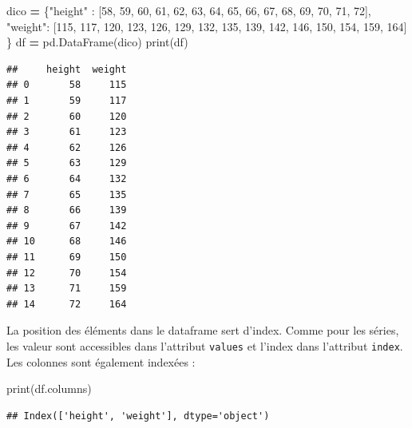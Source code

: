 \documentclass[
  12pt,
]{book}
\newenvironment{Shaded}{\begin{snugshade}}{\end{snugshade}}
\newcommand{\BuiltInTok}[1]{#1}
\newcommand{\DecValTok}[1]{\textcolor[rgb]{0.00,0.00,0.81}{#1}}
\newcommand{\NormalTok}[1]{#1}
\newcommand{\OperatorTok}[1]{\textcolor[rgb]{0.81,0.36,0.00}{\textbf{#1}}}
\newcommand{\StringTok}[1]{\textcolor[rgb]{0.31,0.60,0.02}{#1}}
\numberwithin{equation}{section}
\numberwithin{countremarque}{section}
\begin{document}
\begin{Shaded}
\begin{Highlighting}[]
\NormalTok{dico }\OperatorTok{=}\NormalTok{ \{}\StringTok{"height"}\NormalTok{ : }
\NormalTok{               [}\DecValTok{58}\NormalTok{, }\DecValTok{59}\NormalTok{, }\DecValTok{60}\NormalTok{, }\DecValTok{61}\NormalTok{, }\DecValTok{62}\NormalTok{,}
                \DecValTok{63}\NormalTok{, }\DecValTok{64}\NormalTok{, }\DecValTok{65}\NormalTok{, }\DecValTok{66}\NormalTok{, }\DecValTok{67}\NormalTok{,}
                \DecValTok{68}\NormalTok{, }\DecValTok{69}\NormalTok{, }\DecValTok{70}\NormalTok{, }\DecValTok{71}\NormalTok{, }\DecValTok{72}\NormalTok{],}
        \StringTok{"weight"}\NormalTok{: }
\NormalTok{               [}\DecValTok{115}\NormalTok{, }\DecValTok{117}\NormalTok{, }\DecValTok{120}\NormalTok{, }\DecValTok{123}\NormalTok{, }\DecValTok{126}\NormalTok{,}
                \DecValTok{129}\NormalTok{, }\DecValTok{132}\NormalTok{, }\DecValTok{135}\NormalTok{, }\DecValTok{139}\NormalTok{, }\DecValTok{142}\NormalTok{,}
                \DecValTok{146}\NormalTok{, }\DecValTok{150}\NormalTok{, }\DecValTok{154}\NormalTok{, }\DecValTok{159}\NormalTok{, }\DecValTok{164}\NormalTok{]}
\NormalTok{       \} }
\NormalTok{df }\OperatorTok{=}\NormalTok{ pd.DataFrame(dico)}
\BuiltInTok{print}\NormalTok{(df)}
\end{Highlighting}
\end{Shaded}

\begin{lstlisting}
##     height  weight
## 0       58     115
## 1       59     117
## 2       60     120
## 3       61     123
## 4       62     126
## 5       63     129
## 6       64     132
## 7       65     135
## 8       66     139
## 9       67     142
## 10      68     146
## 11      69     150
## 12      70     154
## 13      71     159
## 14      72     164
\end{lstlisting}

La position des éléments dans le dataframe sert d'index. Comme pour les séries, les valeur sont accessibles dans l'attribut \texttt{values} et l'index dans l'attribut \texttt{index}. Les colonnes sont également indexées :

\begin{Shaded}
\begin{Highlighting}[]
\BuiltInTok{print}\NormalTok{(df.columns)}
\end{Highlighting}
\end{Shaded}

\begin{lstlisting}
## Index(['height', 'weight'], dtype='object')
\end{lstlisting}
\end{document}
